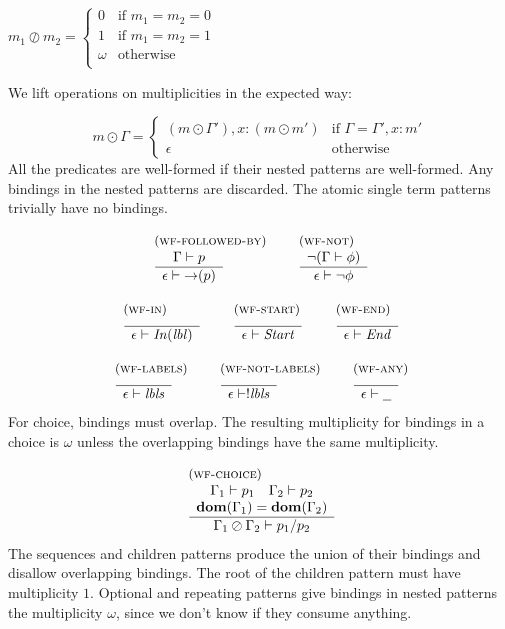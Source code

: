 \documentclass{article}
\newcommand{\rulename}{\textsc}
\newcommand{\irule}[3]{\begin{array}{l}{~\small\mbox{(\rulename{#1})}}\\\;\frac{\begin{array}{c}#2\end{array}}{\begin{array}{l}#3\end{array}}\end{array}}
\newcommand{\lbl}{\ensuremath{\mathit{lbl}}}
\newcommand{\lbls}{\ensuremath{\mathit{lbls}}}
\newcommand{\wfp}[2]{\ensuremath{#1 \vdash #2}}
\newcommand{\por}[2]{\ensuremath{#1/#2}}
\newcommand{\pnot}[1]{\ensuremath{\lnot #1}}
\newcommand{\any}{\ensuremath{\text{\underline{\hspace{0.6em}}}}}
\newcommand{\fb}[1]{\ensuremath{\mathop{\rightarrow}(#1)}}
\newcommand{\pin}[1]{\ensuremath{\mathit{In}(#1)}}
\newcommand{\pstart}{\ensuremath{\mathit{Start}}}
\newcommand{\pend}{\ensuremath{\mathit{End}}}
\begin{document}
$
  m_1 \oslash m_2 =
  \begin{cases}
    0 & \text{if $m_1 = m_2 = 0$}\\
    1 & \text{if $m_1 = m_2 = 1$}\\
    \omega & \text{otherwise}\\
  \end{cases}
$

\noindent
We lift operations on multiplicities in the expected way:

\[
  m \odot \Gamma =
  \begin{cases}
    (m \odot \Gamma'), x : (m \odot m') & \text{if } \Gamma = \Gamma', x : m'\\
    \epsilon & \text{otherwise}
  \end{cases}
\]
%
All the predicates are well-formed if their nested patterns are
well-formed. Any bindings in the nested patterns are discarded.
%
The atomic single term patterns trivially have no bindings.

\[
  \begin{array}{c}
    \irule{wf-followed-by}{
    \wfp{\Gamma}{p}
    }{
    \wfp{\epsilon}{\fb{p}}
    }
    \quad
    \irule{wf-not}{
    \lnot(\wfp{\Gamma}{\phi})
    }{
    \wfp{\epsilon}{\pnot{\phi}}
    }
    \\\\
    \irule{wf-in}{
    }{
    \wfp{\epsilon}{\pin{\lbl}}
    }
    \quad
    \irule{wf-start}{
    }{
    \wfp{\epsilon}{\pstart}
    }
    \quad
    \irule{wf-end}{
    }{
    \wfp{\epsilon}{\pend}
    }
    \\\\
    \irule{wf-labels}{
    }{
    \wfp{\epsilon}{\lbls}
    }
    \quad
    \irule{wf-not-labels}{
    }{
    \wfp{\epsilon}{!\lbls}
    }
    \quad
    \irule{wf-any}{
    }{
    \wfp{\epsilon}{\any}
    }
  \end{array}
\]
%
For choice, bindings must overlap. The resulting multiplicity for
bindings in a choice is $\omega$ unless the overlapping bindings
have the same multiplicity.

\[
  \begin{array}{c}
    \irule{wf-choice}{
    \wfp{\Gamma_1}{p_1}
    \quad
    \wfp{\Gamma_2}{p_2}\\
    \mathbf{dom}(\Gamma_1) = \mathbf{dom}(\Gamma_2)
    }{
    \wfp{\Gamma_1 \oslash \Gamma_2}{\por{p_1}{p_2}}
    }
  \end{array}
\]
%
The sequences and children patterns produce the union of their
bindings and disallow overlapping bindings. The root of the
children pattern must have multiplicity $1$.
%
Optional and repeating patterns give bindings in nested patterns
the multiplicity $\omega$, since we don't know if they consume
anything.
\end{document}
